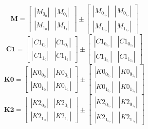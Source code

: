 \documentclass[landscape]{article}
\begin{document}
\begin{equation}
\mathbf{M}=
\left[
\begin{array}{rr}
    |M_0_0| & |M_0_1|\\
    |M_1_0| & |M_1_1|
\end{array}
\right]
\pm
\left[
\begin{array}{rr}
    |M_0_0_?| & |M_0_1_?|\\
    |M_1_0_?| & |M_1_1_?|
\end{array}
\right]
\label{eq:M}
\end{equation}
\begin{equation}
\mathbf{C1}=
\left[
\begin{array}{rr}
    |C1_0_0| & |C1_0_1|\\
    |C1_1_0| & |C1_1_1|
\end{array}
\right]
\pm
\left[
\begin{array}{rr}
    |C1_0_0_?| & |C1_0_1_?|\\
    |C1_1_0_?| & |C1_1_1_?|
\end{array}
\right]
\label{eq:C1}
\end{equation}
\begin{equation}
\mathbf{K0}=
\left[
\begin{array}{rr}
    |K0_0_0| & |K0_0_1|\\
    |K0_1_0| & |K0_1_1|
\end{array}
\right]
\pm
\left[
\begin{array}{rr}
    |K0_0_0_?| & |K0_0_1_?|\\
    |K0_1_0_?| & |K0_1_1_?|
\end{array}
\right]
\label{eq:K0}
\end{equation}
\begin{equation}
\mathbf{K2}=
\left[
\begin{array}{rr}
    |K2_0_0| & |K2_0_1|\\
    |K2_1_0| & |K2_1_1|
\end{array}
\right]
\pm
\left[
\begin{array}{rr}
    |K2_0_0_?| & |K2_0_1_?|\\
    |K2_1_0_?| & |K2_1_1_?|
\end{array}
\right]
\label{eq:K2}
\end{equation}
\end{document}
